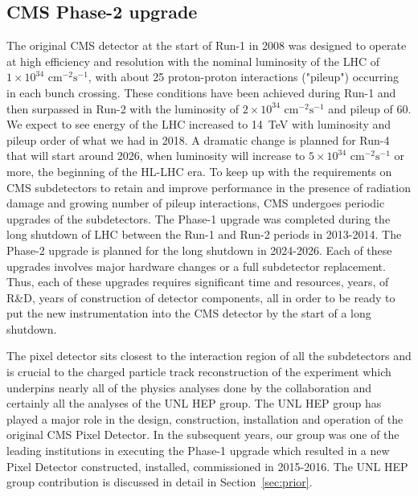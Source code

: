 \subsection{CMS Phase-2 upgrade}


The original CMS detector at the start of Run-1 in 2008 was designed to operate at high efficiency and resolution with the nominal luminosity of the LHC of $1\times10^{34}\textrm{ cm}^{-2}\textrm{s}^{-1}$, with about 25 proton-proton interactions ("pileup") occurring in each bunch crossing. These conditions have been achieved during Run-1 and then surpassed in Run-2 with the luminosity of $2\times10^{34}\textrm{ cm}^{-2}\textrm{s}^{-1}$ and pileup of 60. We expect to see energy of the LHC increased to 14~TeV with luminosity and pileup order of what we had in 2018. A dramatic change is planned for Run-4 that will start around 2026, when luminosity will increase to $5\times10^{34}\textrm{ cm}^{-2}\textrm{s}^{-1}$ or more, the beginning of the HL-LHC era. To keep up with the requirements on CMS subdetectors to retain and improve performance in the presence of radiation damage and growing number of pileup interactions, CMS undergoes periodic upgrades of the subdetectors. The Phase-1 upgrade was completed during the long shutdown of LHC between the Run-1 and Run-2 periods in 2013-2014. The Phase-2 upgrade is planned for the long shutdown in 2024-2026. Each of these upgrades involves major hardware changes or a full subdetector replacement. Thus, each of these upgrades requires significant time and resources, years, of R\&D, years of construction of detector components, all in order to be ready to put the new instrumentation into the CMS detector by the start of a long shutdown.

The pixel detector sits closest to the interaction region of all the subdetectors and is crucial to the charged particle track reconstruction of the experiment which underpins nearly all of the physics analyses done by the collaboration and certainly all the analyses of the UNL HEP group. The UNL HEP group has played a major role in the design, construction, installation and operation of the original CMS Pixel Detector. In the subsequent years, our group was one of the leading institutions in executing the Phase-1 upgrade which resulted in a new Pixel Detector constructed, installed, commissioned in 2015-2016. The UNL HEP group contribution is discussed in detail in Section~\ref{sec:prior}. 

